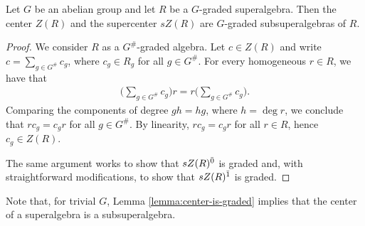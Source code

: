 \begin{lemma}%
	Let $G$ be an abelian group and let $R$ be a $G$-graded superalgebra.
	Then the center $Z(R)$ and the supercenter $sZ(R)$ are $G$-graded subsuperalgebras of $R$.
\end{lemma}

\begin{proof}
	We consider $R$ as a $G^\#$-graded algebra.
	Let $c \in Z(R)$ and write $c = \sum_{g \in G^\#} c_g$, where $c_g \in R_g$ for all $g \in G^\#$.
	For every homogeneous $r \in R$, we have that
	\begin{align*}
		\big(\sum_{g\in G^\#} c_g\big)r = r \big(\sum_{g\in G^\#} c_g\big).
	\end{align*}
	Comparing the components of degree $gh = hg$, where $h = \deg r$, we conclude that $rc_g = c_g r$ for all $g \in G^\#$.
	By linearity, $r c_g = c_g r$ for all $r\in R$, hence $c_g \in Z(R)$.

	The same argument works to show that $sZ(R)^{\bar0}$ is graded and, with straightforward modifications, to show that $sZ(R)^{\bar1}$ is graded.
\end{proof}

Note that, for trivial $G$, Lemma \ref{lemma:center-is-graded} implies that the center of a superalgebra is a subsuperalgebra. 









